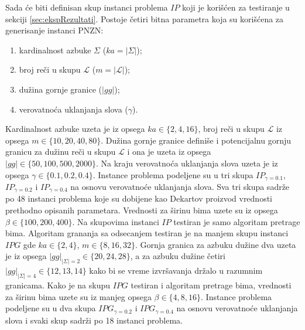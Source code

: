 \documentclass[12pt,oneside]{memoir}
\begin{document}
Sada će biti definisan skup instanci problema $IP$ koji je korišćen za testiranje u sekciji \ref{sec:ekspRezultati}.
Postoje četiri bitna parametra koja su korišćena za generisanje instanci PNZN:
\begin{enumerate}
  \item kardinalnost azbuke $\Sigma$ ($ka=|\Sigma|$);
  \item broj reči u skupu $\mathcal{L}$ ($m=|\mathcal{L}|$);
  \item dužina gornje granice ($|gg|$);
  \item verovatnoća uklanjanja slova ($\gamma$).
\end{enumerate}
Kardinalnost azbuke uzeta je iz opsega $ka \in \{2,4,16 \}$, broj reči u skupu $\mathcal{L}$
iz opsega $m \in \{10,20,40,80\}$. Dužina gornje granice definiše i potencijalnu gornju
granicu za dužinu reči u skupu $\mathcal{L}$ i ona je uzeta iz opsega $|gg| \in \{50,100,500,2000\}$.
Na kraju verovatnoća uklanjanja slova uzeta je iz opsega $\gamma \in \{0.1,0.2,0.4\}$.
Instance problema podeljene su u tri skupa $IP_{\gamma=0.1}$, $IP_{\gamma=0.2}$ i $IP_{\gamma=0.4}$
na osnovu verovatnoće uklanjanja slova. Sva tri skupa sadrže po 48 instanci problema
koje su dobijene kao Dekartov proizvod vrednosti prethodno opisanih parametara.
Vrednosti za širinu bima uzete su iz opsega $\beta \in \{100,200,400\}$.
Na skupovima instanci $IP$ testiran je samo algoritam pretrage bima.
Algoritam grananja sa odsecanjem testiran je na manjem skupu instanci
$IPG$ gde $ka \in \{2,4\}$, $m \in \{8,16,32\}$. Gornja granica za azbuku dužine dva
uzeta je iz opsega $|gg|_{|\Sigma|=2} \in \{20,24,28\}$, a za azbuku dužine četiri
$|gg|_{|\Sigma|=4} \in \{12,13,14\}$ kako bi se vreme izvršavanja držalo u razumnim
granicama. Kako je na skupu $IPG$ testiran i algoritam pretrage bima,
vrednosti za širinu bima uzete su iz manjeg opsega $\beta \in \{4,8,16\}$.
Instance problema podeljene su u dva skupa $IPG_{\gamma=0.2}$ i $IPG_{\gamma=0.4}$
na osnovu verovatnoće uklanjanja slova i svaki skup sadrži po 18 instanci problema.
\end{document}
